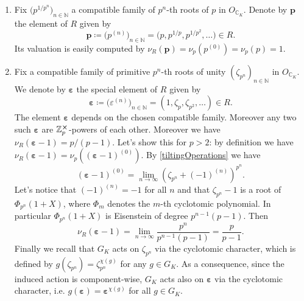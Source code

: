 \begin{ex}[]\leavevmode\vspace{-.2\baselineskip}\label{ExampleEltsTilt}
\begin{enumerate}
\item Fix $\big( p^{1/p^n} \big)_{n \in \mathbb{N}}$ 
	a compatible family of $p^n$-th roots of $p$
	in $O_{\mathbb{C}_K}$.
	Denote by $\mathbf{p}$ the element of $R$ given by
	\begin{equation*}
		\mathbf{p} \coloneqq \big( p^{(n)} \big)_{n \in \mathbb{N}} =
		\big( p, p^{1/p}, p^{1/p^2}, \ldots \big) \in R
	.\end{equation*}
	Its valuation is easily computed by
	$\nu_R(\mathbf{p}) = \nu_p(p^{(0)}) = \nu_p(p) = 1$.

\item Fix a compatible family of primitive $p^n$-th roots of unity
	$\left( \zeta_{p^n} \right)_{n \in \mathbb{N}}$ in $O_{\mathbb{C}_K}$.
	We denote by $\boldsymbol\varepsilon$ the special element of $R$ given by
	\begin{equation*}
		\boldsymbol\varepsilon \coloneqq \big( \varepsilon^{(n)} \big)_{n \in \mathbb{N}} =
		\left( 1, \zeta_p, \zeta_{p^2}, \ldots \right) \in R
	.\end{equation*}
	The element $\boldsymbol\varepsilon$ depends on the chosen
	compatible family.
	Moreover any two such $\boldsymbol\varepsilon$
	are $\mathbb{Z}_{p}^{\cross}$-powers of each other.
	Moreover we have
	$\nu_R \left( \boldsymbol\varepsilon - 1 \right) = p/ (p - 1)$.
	Let's show this for $p > 2$: by definition we have
	$\nu_R(\boldsymbol\varepsilon - 1) = \nu_p \left( (\boldsymbol\varepsilon -1 )^{(0)} \right)$.
	By \cref{tiltingOperations} we have
	\begin{equation*}
		\left( \boldsymbol\varepsilon -1 \right)^{(0)} =
		\lim_{n \to \infty} \left( \zeta_{p^n} + (-1)^{(n)} \right)^{p^n}
	.\end{equation*}
	Let's notice that $\left( -1 \right)^{(n)} = -1$ for all $n$
	and that $\zeta_{p^n} - 1$ is a root of $\Phi_{p^n}(1+X)$,
	where $\Phi_m$ denotes the $m$-th cyclotomic polynomial.
	In particular $\Phi_{p^n}(1+X)$ is Eisenstein of degree
	$p^{n-1}(p-1)$.
	Then
	\begin{equation*}
		\nu_R(\boldsymbol\varepsilon - 1) =
		\lim_{n \to \infty} \frac{ p^n }{ p^{n-1}(p-1) } =
		\frac{ p }{ p-1 }
	.\end{equation*}
	Finally we recall that $G_K$ acts on $\zeta_{p^n}$ via
	the cyclotomic character, which is defined by
	$g(\zeta_{p^n}) = \zeta_{p^n}^{\chi(g)}$ for any $g \in G_K$.
	As a consequence, since the induced action is component-wise,
	$G_K$ acts also on $\boldsymbol\varepsilon$ via the cyclotomic character,
	i.e. $g(\boldsymbol\varepsilon) = \boldsymbol\varepsilon^{\chi(g)}$
	for all $g \in G_K$.
\end{enumerate}
\end{ex}


